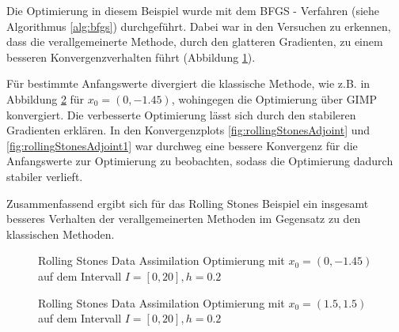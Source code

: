 Die Optimierung in diesem Beispiel wurde mit dem BFGS - Verfahren (siehe Algorithmus \ref{alg:bfgs}) durchgeführt. Dabei war in den Versuchen zu erkennen, dass die verallgemeinerte Methode, durch den glatteren Gradienten, zu einem besseren Konvergenzverhalten führt (Abbildung \ref{fig:rollingStonesOpt2}).

Für bestimmte Anfangswerte divergiert die klassische Methode, wie z.B. in Abbildung \ref{fig:rollingStonesOpt1} für $x_0=(0,-1.45)$, wohingegen die Optimierung über GIMP konvergiert. 
Die verbesserte Optimierung lässt sich durch den stabileren Gradienten erklären. In den Konvergenzplots \ref{fig:rollingStonesAdjoint} und \ref{fig:rollingStonesAdjoint1} war durchweg eine bessere Konvergenz für die Anfangswerte zur Optimierung zu beobachten, sodass die Optimierung dadurch stabiler verlieft. 

Zusammenfassend ergibt sich für das Rolling Stones Beispiel ein insgesamt besseres Verhalten der verallgemeinerten Methoden im Gegensatz zu den klassischen Methoden.
\begin{figure}[H]
\footnotesize
\centering
\begin{minipage}[b]{0.49\linewidth}

\end{minipage}
\begin{minipage}[b]{0.49\linewidth}

\end{minipage}
\caption{Rolling Stones Data Assimilation Optimierung mit $x_0=(0,-1.45)$ auf dem Intervall $I = [0,20], h=0.2$}
\label{fig:rollingStonesOpt2}
\end{figure}

\begin{figure}[H]
\footnotesize 
\centering
\begin{minipage}[b]{0.49\linewidth}

\end{minipage}
\begin{minipage}[b]{0.49\linewidth}

\end{minipage}
\caption{Rolling Stones Data Assimilation Optimierung mit $x_0=(1.5,1.5)$ auf dem Intervall $I = [0,20], h=0.2$}
\label{fig:rollingStonesOpt1}
\end{figure}


